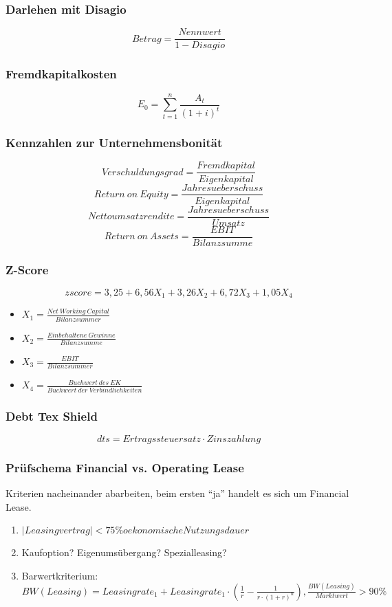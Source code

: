 \subsubsection{Darlehen mit Disagio}
\[Betrag = \frac{Nennwert}{1 - Disagio}\]

\subsubsection{Fremdkapitalkosten}
\[E_0 = \sum_{t=1}^{n} \frac{A_t}{(1+i)^t}\]

\subsubsection{Kennzahlen zur Unternehmensbonität}
\[Verschuldungsgrad = \frac{Fremdkapital}{Eigenkapital}\]
\[Return~on~Equity = \frac{Jahresueberschuss}{Eigenkapital}\]
\[Nettoumsatzrendite = \frac{Jahresueberschuss}{Umsatz}\]
\[Return~on~Assets = \frac{EBIT}{Bilanzsumme}\]

\subsubsection{Z-Score}
\[zscore = 3,25 + 6,56X_1 + 3,26X_2 + 6,72X_3 + 1,05X_4\]
\begin{itemize}
	\item \(X_1 = \frac{Net~Working~Capital}{Bilanzsummer}\)
	\item \(X_2 = \frac{Einbehaltene~Gewinne}{Bilanzsumme}\)
	\item \(X_3 = \frac{EBIT}{Bilanzsummer}\)
	\item \(X_4 = \frac{Buchwert~des~EK}{Buchwert~der~Verbindlichkeiten}\)
\end{itemize}

\subsubsection{Debt Tex Shield}
\[dts = Ertragssteuersatz \cdot Zinszahlung\]

\subsubsection{Prüfschema Financial vs. Operating Lease}
Kriterien nacheinander abarbeiten, beim ersten "`ja"' handelt es sich um Financial Lease.
\begin{enumerate}
	\item \(|Leasingvertrag| < 75\% oekonomische Nutzungsdauer\)
	\item Kaufoption? Eigenumsübergang? Spezialleasing?
	\item Barwertkriterium: \(BW(Leasing) = Leasingrate_1 + Leasingrate_1 \cdot (\frac{1}{r} - \frac{1}{r \cdot (1+r)^n}), \frac{BW(Leasing)}{Marktwert} > 90\%\) 
\end{enumerate}


